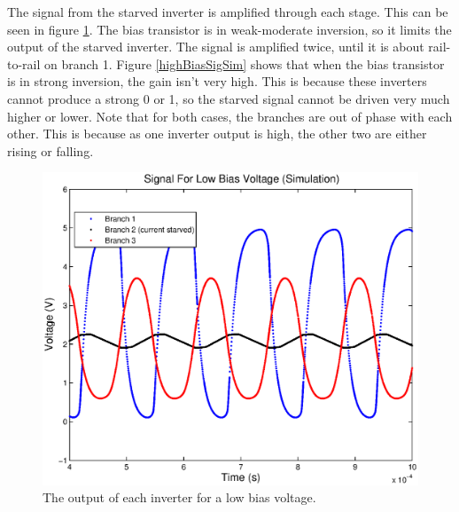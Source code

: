 \documentclass{article}
\begin{document}
The signal from the starved inverter is amplified through each stage. This can be seen in figure \ref{lowBiasSigSim}. The bias transistor is in weak-moderate inversion, so it limits the output of the starved inverter. The signal is amplified twice, until it is about rail-to-rail on branch 1. Figure \ref{highBiasSigSim} shows that when the bias transistor is in strong inversion, the gain isn't very high. This is because these inverters cannot produce a strong 0 or 1, so the starved signal cannot be driven very much higher or lower. Note that for both cases, the branches are out of phase with each other. This is because as one inverter output is high, the other two are either rising or falling. \\


\begin{figure}[H]
\centering
\includegraphics[scale=.7]{lowBiasSigSim.eps}
\caption{The output of each inverter for a low bias voltage.}
\label{lowBiasSigSim}
\end{figure}
\end{document}

